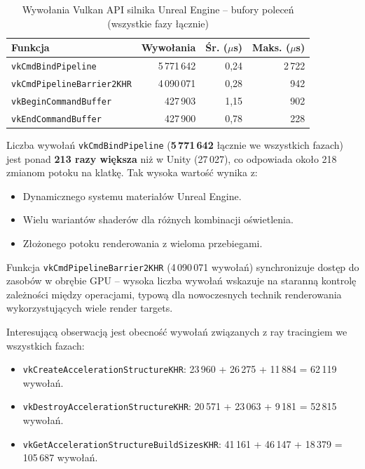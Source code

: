 \begin{table}[H]
\centering
\caption{Wywołania Vulkan API silnika Unreal Engine -- bufory poleceń (wszystkie fazy łącznie)}
\label{tab:unreal-vulkan-cmd}
\small
\begin{tabular}{|l|r|r|r|}
\hline
\textbf{Funkcja} & \textbf{Wywołania} & \textbf{Śr. ($\mu$s)} & \textbf{Maks. ($\mu$s)} \\
\hline
\texttt{vkCmdBindPipeline} & 5\,771\,642 & 0,24 & 2\,722 \\
\texttt{vkCmdPipelineBarrier2KHR} & 4\,090\,071 & 0,28 & 942 \\
\texttt{vkBeginCommandBuffer} & 427\,903 & 1,15 & 902 \\
\texttt{vkEndCommandBuffer} & 427\,900 & 0,78 & 228 \\
\hline
\end{tabular}
\end{table}

Liczba wywołań \texttt{vkCmdBindPipeline} (\textbf{5\,771\,642} 
łącznie we wszystkich fazach) jest ponad \textbf{213 razy większa} niż w 
Unity (27\,027), co odpowiada około 218 zmianom potoku na klatkę. Tak wysoka wartość wynika z:
\begin{itemize}
    \item Dynamicznego systemu materiałów Unreal Engine.
    \item Wielu wariantów shaderów dla różnych kombinacji oświetlenia.
    \item Złożonego potoku renderowania z wieloma przebiegami.
\end{itemize}

Funkcja \texttt{vkCmdPipelineBarrier2KHR} (4\,090\,071 wywołań) synchronizuje dostęp do zasobów w obrębie GPU -- wysoka liczba wywołań wskazuje 
na staranną kontrolę zależności między operacjami, typową dla nowoczesnych technik renderowania wykorzystujących wiele render targets.


Interesującą obserwacją jest obecność wywołań związanych z ray tracingiem we wszystkich fazach:
\begin{itemize}
    \item \texttt{vkCreateAccelerationStructureKHR}: 23\,960 + 26\,275 + 11\,884 = 62\,119 wywołań.
    \item \texttt{vkDestroyAccelerationStructureKHR}: 20\,571 + 23\,063 + 9\,181 = 52\,815 wywołań.
    \item \texttt{vkGetAccelerationStructureBuildSizesKHR}: 41\,161 + 46\,147 + 18\,379 = 105\,687 wywołań.
\end{itemize}


